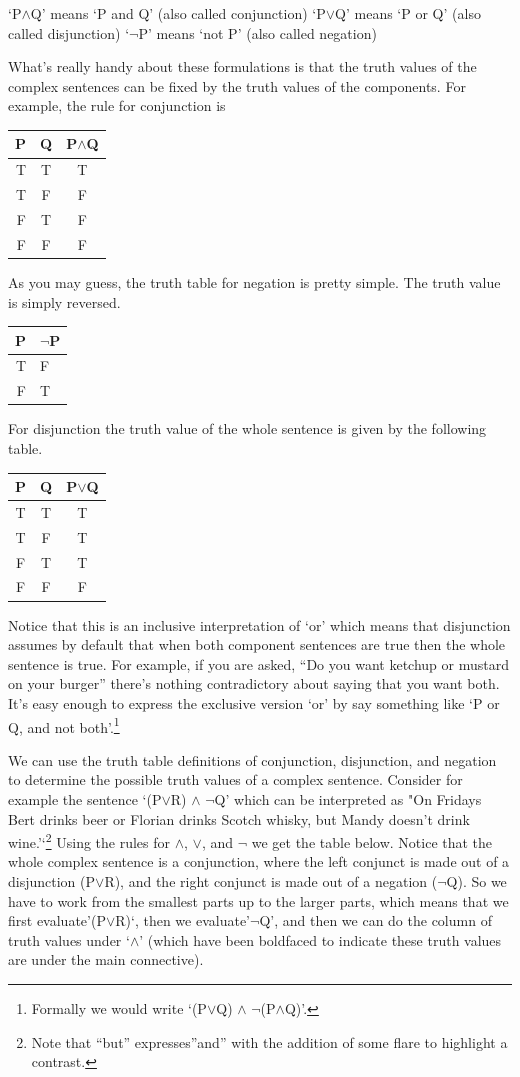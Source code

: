 \documentclass[]{tufte-book}
\begin{document}
`P\(\wedge\)Q' means `P and Q' (also called conjunction)
`P\(\vee\)Q' means `P or Q' (also called disjunction)
`\(\neg\)P' means `not P' (also called negation)

What's really handy about these formulations is that the truth values of the complex sentences can be fixed by the truth values of the components. For example, the rule for conjunction is

\begin{longtable}[]{@{}rcc@{}}
\toprule
P & Q & P\(\wedge\)Q\tabularnewline
\midrule
\endhead
T & T & T\tabularnewline
T & F & F\tabularnewline
F & T & F\tabularnewline
F & F & F\tabularnewline
\bottomrule
\end{longtable}

As you may guess, the truth table for negation is pretty simple. The truth value is simply reversed.

\begin{longtable}[]{@{}rl@{}}
\toprule
P & \(\neg\)P\tabularnewline
\midrule
\endhead
T & F\tabularnewline
F & T\tabularnewline
\bottomrule
\end{longtable}

For disjunction the truth value of the whole sentence is given by the following table.

\begin{longtable}[]{@{}ccc@{}}
\toprule
P & Q & P\(\vee\)Q\tabularnewline
\midrule
\endhead
T & T & T\tabularnewline
T & F & T\tabularnewline
F & T & T\tabularnewline
F & F & F\tabularnewline
\bottomrule
\end{longtable}

Notice that this is an inclusive interpretation of `or' which means that disjunction assumes by default that when both component sentences are true then the whole sentence is true. For example, if you are asked, ``Do you want ketchup or mustard on your burger'' there's nothing contradictory about saying that you want both. It's easy enough to express the exclusive version `or' by say something like `P or Q, and not both'.\footnote{Formally we would write `(P\(\vee\)Q) \(\wedge\) \(\neg\)(P\(\wedge\)Q)'.}

We can use the truth table definitions of conjunction, disjunction, and negation to determine the possible truth values of a complex sentence. Consider for example the sentence `(P\(\vee\)R) \(\wedge\) \(\neg\)Q' which can be interpreted as "On Fridays Bert drinks beer or Florian drinks Scotch whisky, but Mandy doesn't drink wine.'`\footnote{Note that ``but'' expresses''and'' with the addition of some flare to highlight a contrast.} Using the rules for \(\wedge\), \(\vee\), and \(\neg\) we get the table below. Notice that the whole complex sentence is a conjunction, where the left conjunct is made out of a disjunction (P\(\vee\)R), and the right conjunct is made out of a negation (\(\neg\)Q). So we have to work from the smallest parts up to the larger parts, which means that we first evaluate'(P\(\vee\)R)`, then we evaluate'\(\neg\)Q', and then we can do the column of truth values under `\(\wedge\)' (which have been boldfaced to indicate these truth values are under the main connective).
\end{document}
